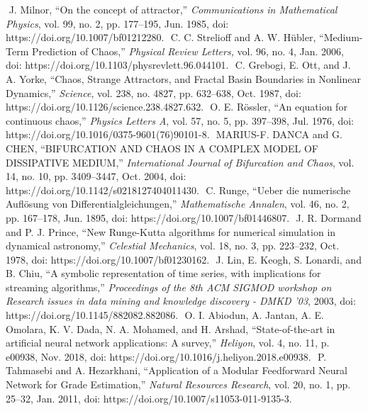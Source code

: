 \documentclass[conference]{IEEEtran}
\begin{document}
\begin{thebibliography}{00}
‌‌‌ J. Milnor, “On the concept of attractor,” \textit{Communications in Mathematical Physics}, vol. 99, no. 2, pp. 177–195, Jun. 1985, doi: https://doi.org/10.1007/bf01212280.
‌‌‌‌ C. C. Strelioff and A. W. Hübler, “Medium-Term Prediction of Chaos,” \textit{Physical Review Letters,} vol. 96, no. 4, Jan. 2006, doi: https://doi.org/10.1103/physrevlett.96.044101.
‌‌‌‌ C. Grebogi, E. Ott, and J. A. Yorke, “Chaos, Strange Attractors, and Fractal Basin Boundaries in Nonlinear Dynamics,” \textit{Science}, vol. 238, no. 4827, pp. 632–638, Oct. 1987, doi: https://doi.org/10.1126/science.238.4827.632.
‌‌‌‌ O. E. Rössler, “An equation for continuous chaos,” \textit{Physics Letters A}, vol. 57, no. 5, pp. 397–398, Jul. 1976, doi: https://doi.org/10.1016/0375-9601(76)90101-8.
‌‌‌‌ MARIUS-F. DANCA and G. CHEN, “BIFURCATION AND CHAOS IN A COMPLEX MODEL OF DISSIPATIVE MEDIUM,” \textit{International Journal of Bifurcation and Chaos}, vol. 14, no. 10, pp. 3409–3447, Oct. 2004, doi: https://doi.org/10.1142/s0218127404011430.
‌‌‌‌ C. Runge, “Ueber die numerische Auflösung von Differentialgleichungen,” \textit{Mathematische Annalen}, vol. 46, no. 2, pp. 167–178, Jun. 1895, doi: https://doi.org/10.1007/bf01446807.
‌‌‌‌‌ J. R. Dormand and P. J. Prince, “New Runge-Kutta algorithms for numerical simulation in dynamical astronomy,” \textit{Celestial Mechanics}, vol. 18, no. 3, pp. 223–232, Oct. 1978, doi: https://doi.org/10.1007/bf01230162.
‌‌‌‌‌ J. Lin, E. Keogh, S. Lonardi, and B. Chiu, “A symbolic representation of time series, with implications for streaming algorithms,” \textit{Proceedings of the 8th ACM SIGMOD workshop on Research issues in data mining and knowledge discovery - DMKD ’03}, 2003, doi: https://doi.org/10.1145/882082.882086.
‌‌‌‌‌ O. I. Abiodun, A. Jantan, A. E. Omolara, K. V. Dada, N. A. Mohamed, and H. Arshad, “State-of-the-art in artificial neural network applications: A survey,” \textit{Heliyon}, vol. 4, no. 11, p. e00938, Nov. 2018, doi: https://doi.org/10.1016/j.heliyon.2018.e00938.
‌‌‌‌‌ P. Tahmasebi and A. Hezarkhani, “Application of a Modular Feedforward Neural Network for Grade Estimation,” \textit{Natural Resources Research}, vol. 20, no. 1, pp. 25–32, Jan. 2011, doi: https://doi.org/10.1007/s11053-011-9135-3.
‌
\end{thebibliography}
\end{document}
